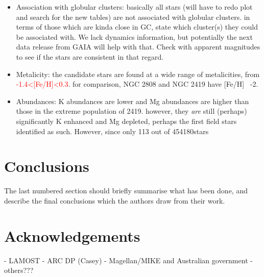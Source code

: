 \documentclass[a4paper,fleqn,usenatbib]{mnras}
\newcommand{\todo}[1]{\textcolor{red}{#1}}
\newcommand{\LamostGiants}{454180}
\begin{document}
\begin{itemize}
\item Association with globular clusters: basically all stars (will have to redo plot and search for the new tables) are not associated with globular clusters. in terms of those which are kinda close in GC, state which cluster(s) they could be associated with. We lack dynamics information, but potentially the next data release from GAIA will help with that. Check with apparent magnitudes to see if the stars are consistent in that regard.

\item Metalicity: the candidate stars are found at a wide range of metalicities, from \todo{-1.4<[Fe/H]<0.3}. for comparison, NGC 2808 and NGC 2419 have [Fe/H] ~-2.

\item Abundances: K abundances are lower and Mg abundances are higher than those in the extreme population of 2419. however, they \textit{are} still (perhaps) significantly K enhanced and Mg depleted, perhaps the first field stars identified as such. However, since only 113 out of \LamostGiants stars 



\end{itemize}

\section{Conclusions}

The last numbered section should briefly summarise what has been done, and describe
the final conclusions which the authors draw from their work.

\section*{Acknowledgements}

- LAMOST
- ARC DP (Casey)
- Magellan/MIKE and Australian government
- others???







\end{document}
